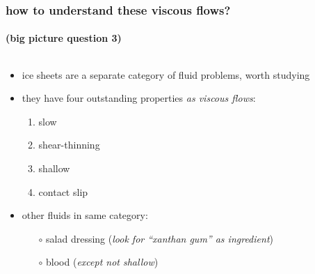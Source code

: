 \documentclass[10pt,hyperref={pdfpagelabels=true}]{beamer}
\begin{document}
\begin{frame}
  \frametitle{how to understand these viscous flows?}
  \framesubtitle{(big picture question 3)}

\begin{columns}
\begin{column}{0.6\textwidth}
\begin{itemize}
\item ice sheets are a separate category of fluid problems, worth studying
\item they have four outstanding properties \emph{as viscous flows}:
  \begin{enumerate}
  \item \alert{slow}
  \item \alert{shear-thinning}
  \item \alert{shallow}
  \item \alert{contact slip}
  \end{enumerate}
\item other fluids in same category:
  \begin{itemize}
  \item[$\circ$] salad dressing (\emph{look for ``xanthan gum'' as ingredient})
  \item[$\circ$] blood (\emph{except not shallow})
  \end{itemize}
\end{itemize}
\end{column}
\begin{column}{0.4\textwidth}


\end{column}
\end{columns}
\end{frame}
\end{document}
